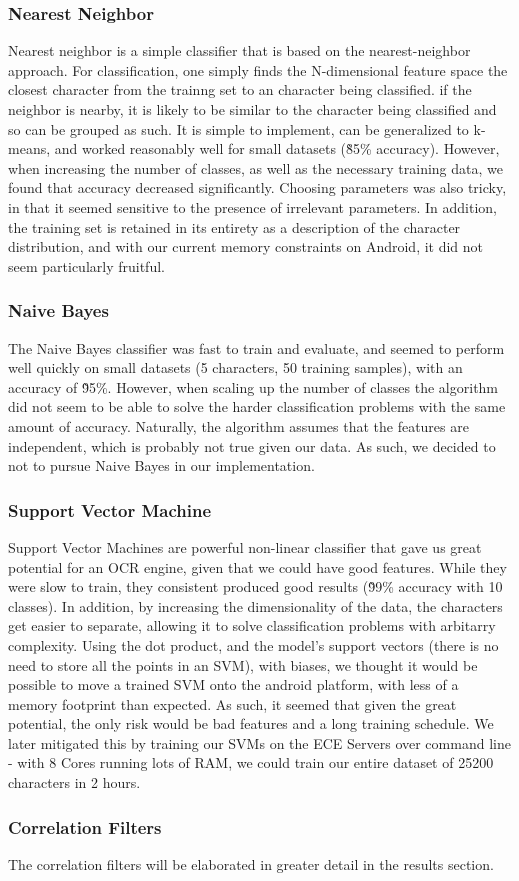 \subsubsection{Nearest Neighbor}
Nearest neighbor is a simple classifier that is based on the nearest-neighbor approach. For classification, one simply finds the N-dimensional 
feature space the closest character from the trainng set to an character being classified. if the neighbor is nearby, it is likely to be similar to 
the character being classified and so can be grouped as such. It is simple to implement, can be generalized to k-means, and worked reasonably 
well for small datasets (\~85\% accuracy). However, when increasing the number of classes, as well as the necessary training data, we found 
that accuracy decreased significantly. Choosing parameters was also tricky, in that it seemed sensitive to the presence of irrelevant parameters.
In addition, the training set is retained in its entirety as a description of the character distribution,
and with our current memory constraints on Android, it did not seem particularly fruitful. 

\subsubsection{Naive Bayes}
The Naive Bayes classifier was fast to train and evaluate, and seemed to perform well quickly on small datasets (5 characters, 50 training samples),
with an accuracy of \~95\%. However, when scaling up the number of classes the algorithm did not seem to be able to solve the harder classification
problems with the same amount of accuracy. Naturally, the algorithm assumes that the features are independent, which is probably not true given our
data. As such, we decided to not to pursue Naive Bayes in our implementation.

\subsubsection{Support Vector Machine}
Support Vector Machines are powerful non-linear classifier that gave us great potential for an OCR engine, given that we could
have good features. While they were slow to train, they consistent produced good results (\~99\% accuracy with 10 classes). In addition,
by increasing the dimensionality of the data, the characters get easier to separate, allowing it to solve classification problems with
arbitarry complexity. Using the dot product, and the model's support vectors (there is no need to store all the points in an SVM), with biases,
we thought it would be possible to move a trained SVM onto the android platform, with less of a memory footprint than expected. As such, it seemed
that given the great potential, the only risk would be bad features and a long training schedule. We later mitigated this by training our
SVMs on the ECE Servers over command line - with 8 Cores running lots of RAM, we could train our entire dataset of 25200 characters in 2 hours.

\subsubsection{Correlation Filters}
The correlation filters will be elaborated in greater detail in the results section.
